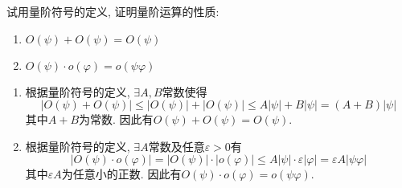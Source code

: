 \begin{problem}[习题1.4]
试用量阶符号的定义, 证明量阶运算的性质:
\begin{enumerate}
\item $O(\psi) + O(\psi) = O(\psi)$
\item $O(\psi) \cdot o(\varphi) = o(\psi\varphi)$
\end{enumerate}
\end{problem}

\begin{solution}
\begin{enumerate}
\item 根据量阶符号的定义, $\exists A,B$常数使得
\[
|O(\psi)+O(\psi)|\leq|O(\psi)|+|O(\psi)|\leq A|\psi|+B|\psi|=(A+B)|\psi|
\]
其中$A+B$为常数. 因此有$O(\psi)+O(\psi)=O(\psi)$.
\item 根据量阶符号的定义, $\exists A$常数及任意$\varepsilon>0$有
\[
|O(\psi)\cdot o(\varphi)|=|O(\psi)|\cdot|o(\varphi)|\leq A|\psi|\cdot\varepsilon|\varphi|=\varepsilon A|\psi\varphi|
\]
其中$\varepsilon A$为任意小的正数. 因此有$O(\psi)\cdot o(\varphi)=o(\psi\varphi)$.\end{enumerate}
\end{solution} 
